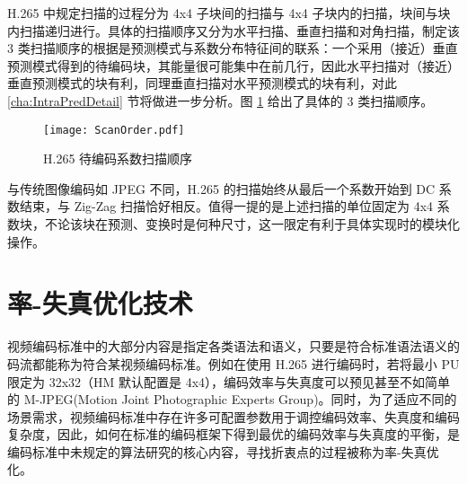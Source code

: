 H.265 中规定扫描的过程分为 4x4 子块间的扫描与 4x4 子块内的扫描，块间与块内扫描递归进行。具体的扫描顺序又分为水平扫描、垂直扫描和对角扫描，制定该 3 类扫描顺序的根据是预测模式与系数分布特征间的联系：一个采用（接近）垂直预测模式得到的待编码块，其能量很可能集中在前几行，因此水平扫描对（接近）垂直预测模式的块有利，同理垂直扫描对水平预测模式的块有利，对此 \ref{cha:IntraPredDetail} 节将做进一步分析。图 \ref{fig:ScanOrder} 给出了具体的 3 类扫描顺序。
\begin{figure}[hbt]
    \centering
    \texttt{[image: ScanOrder.pdf]}
    \caption{H.265 待编码系数扫描顺序}
    \label{fig:ScanOrder}
\end{figure}

与传统图像编码如 JPEG 不同，H.265 的扫描始终从最后一个系数开始到 DC 系数结束，与 Zig-Zag 扫描恰好相反。值得一提的是上述扫描的单位固定为 4x4 系数块，不论该块在预测、变换时是何种尺寸，这一限定有利于具体实现时的模块化操作。

\section{率-失真优化技术}
视频编码标准中的大部分内容是指定各类语法和语义，只要是符合标准语法语义的码流都能称为符合某视频编码标准。例如在使用 H.265 进行编码时，若将最小 PU 限定为 32x32（HM 默认配置是 4x4），编码效率与失真度可以预见甚至不如简单的 M-JPEG(Motion Joint Photographic Experts Group)。同时，为了适应不同的场景需求，视频编码标准中存在许多可配置参数用于调控编码效率、失真度和编码复杂度，因此，如何在标准的编码框架下得到最优的编码效率与失真度的平衡，是编码标准中未规定的算法研究的核心内容，寻找折衷点的过程被称为率-失真优化。

